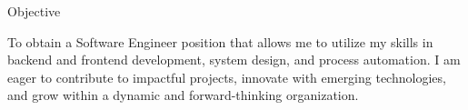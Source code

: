 \documentclass[]{kyvernitis-resume}
\begin{document}
\resumeheader
{}
{}
{}
{}
{\address{Karaj, Alborz Province, Iran}}
{}

\begin{section}{Objective}

To obtain a Software Engineer position that allows me to utilize my skills in backend and frontend development, system design, and process automation. I am eager to contribute to impactful projects, innovate with emerging technologies, and grow within a dynamic and forward-thinking organization.

\end{section}
\end{document}
